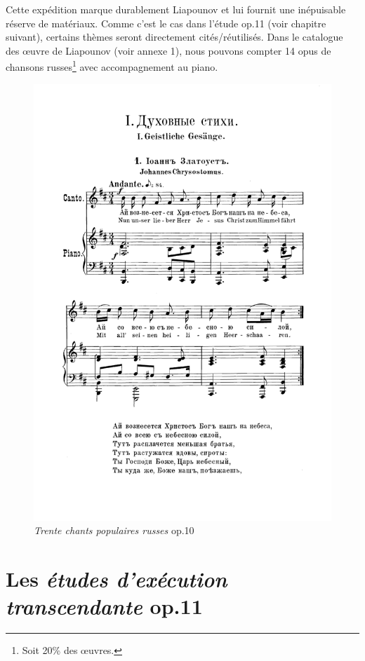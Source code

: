 Cette expédition marque durablement Liapounov et lui fournit une inépuisable réserve de matériaux. Comme c'est le cas dans l'étude op.11  (voir chapitre suivant), certains thèmes seront directement cités/réutilisés. Dans le catalogue des œuvre de Liapounov (voir annexe 1), nous pouvons compter 14 opus de chansons russes\footnote{Soit 20\% des œuvres.} avec accompagnement au piano.

\begin{figure}[!p]
  \includegraphics[width=16cm, keepaspectratio]{chanson.png}
  \caption{\label{chanson}\emph{Trente chants populaires russes} op.10 }
\end{figure}
\newpage

\section{Les \emph{études d'exécution transcendante} op.11}

